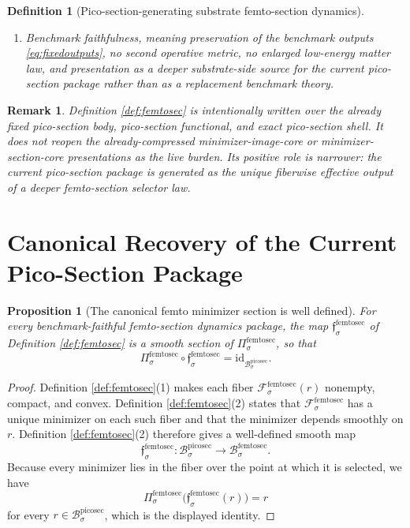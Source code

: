 \documentclass[11pt]{article}
\newcommand{\PicoSectionBody}[1]{\mathcal B_{#1}^{\mathrm{picosec}}}
\newcommand{\PicoSectionShell}[1]{\mathcal Z_{#1}^{\mathrm{picosec}}}
\newcommand{\FemtoSectionBody}[1]{\mathcal B_{#1}^{\mathrm{femtosec}}}
\newcommand{\FemtoSectionProj}[1]{\Pi_{#1}^{\mathrm{femtosec}}}
\newcommand{\FemtoSectionFiber}[2]{\mathcal F_{#1}^{\mathrm{femtosec}}(#2)}
\newcommand{\FemtoSectionPicoMin}[1]{\mathfrak f_{#1}^{\mathrm{femtosec}}}
\newcommand{\FemtoSectionFunctional}[1]{\mathscr F_{#1}^{\mathrm{femtosec}}}
\newcommand{\FemtoSectionShell}[1]{\mathcal Z_{#1}^{\mathrm{femtosec}}}
\newtheorem{definition}{Definition}
\newtheorem{proposition}{Proposition}
\newtheorem{remark}{Remark}
\begin{document}
\begin{definition}[Pico-section-generating substrate femto-section dynamics]
\begin{enumerate}
\[\begin{array}{l}
    \FemtoSectionFunctional{\sigma}(t)
    =
    \displaystyle\min_{u\in\FemtoSectionFiber{\sigma}{\FemtoSectionProj{\sigma}(t)}}
    \FemtoSectionFunctional{\sigma}(u)
    \end{array}
    \right\},
    \]
    and
    \[
    \FemtoSectionProj{\sigma}\big|_{\FemtoSectionShell{\sigma}}
    :
    \FemtoSectionShell{\sigma}
    \xrightarrow{\cong}
    \PicoSectionShell{\sigma}
    \]
    is a diffeomorphism.
    \item Benchmark faithfulness, meaning preservation of the benchmark outputs \eqref{eq:fixedoutputs}, no second operative metric, no enlarged low-energy matter law, and presentation as a deeper substrate-side source for the current pico-section package rather than as a replacement benchmark theory.
\end{enumerate}
\end{definition}

\begin{remark}
Definition \ref{def:femtosec} is intentionally written over the already fixed pico-section body, pico-section functional, and exact pico-section shell. It does not reopen the already-compressed minimizer-image-core or minimizer-section-core presentations as the live burden. Its positive role is narrower: the current pico-section package is generated as the unique fiberwise effective output of a deeper femto-section selector law.
\end{remark}

\section{Canonical Recovery of the Current Pico-Section Package}

\begin{proposition}[The canonical femto minimizer section is well defined]
\label{prop:section}
For every benchmark-faithful femto-section dynamics package, the map \(\FemtoSectionPicoMin{\sigma}\) of Definition \ref{def:femtosec} is a smooth section of \(\FemtoSectionProj{\sigma}\), so that
\[
\FemtoSectionProj{\sigma}\circ\FemtoSectionPicoMin{\sigma}
=
\mathrm{id}_{\PicoSectionBody{\sigma}}.
\]
\end{proposition}

\begin{proof}
Definition \ref{def:femtosec}(1) makes each fiber \(\FemtoSectionFiber{\sigma}{r}\) nonempty, compact, and convex. Definition \ref{def:femtosec}(2) states that \(\FemtoSectionFunctional{\sigma}\) has a unique minimizer on each such fiber and that the minimizer depends smoothly on \(r\). Definition \ref{def:femtosec}(2) therefore gives a well-defined smooth map
\[
\FemtoSectionPicoMin{\sigma}:\PicoSectionBody{\sigma}\to\FemtoSectionBody{\sigma}.
\]
Because every minimizer lies in the fiber over the point at which it is selected, we have
\[
\FemtoSectionProj{\sigma}\bigl(\FemtoSectionPicoMin{\sigma}(r)\bigr)=r
\]
for every \(r\in\PicoSectionBody{\sigma}\), which is the displayed identity.
\end{proof}
\end{document}
